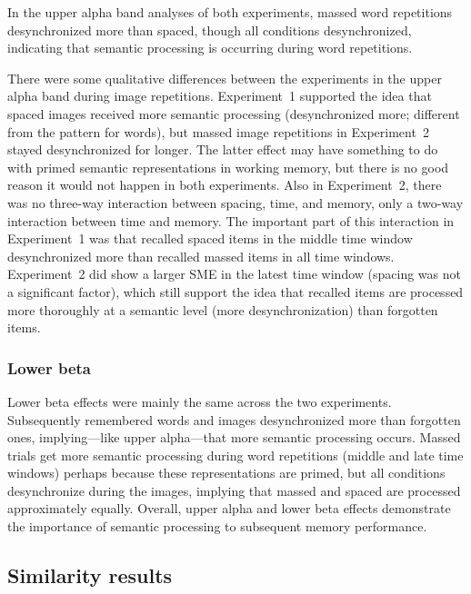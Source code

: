 In the upper alpha band analyses of both experiments, massed word repetitions desynchronized more than spaced, though all conditions desynchronized, indicating that semantic processing is occurring during word repetitions.

There were some qualitative differences between the experiments in the upper alpha band during image repetitions.  Experiment~1 supported the idea that spaced images received more semantic processing (desynchronized more; different from the pattern for words), but massed image repetitions in Experiment~2 stayed desynchronized for longer.  The latter effect may have something to do with primed semantic representations in working memory, but there is no good reason it would not happen in both experiments.  Also in Experiment~2, there was no three-way interaction between spacing, time, and memory, only a two-way interaction between time and memory.  The important part of this interaction in Experiment~1 was that recalled spaced items in the middle time window desynchronized more than recalled massed items in all time windows.  Experiment~2 did show a larger SME in the latest time window (spacing was not a significant factor), which still support the idea that recalled items are processed more thoroughly at a semantic level (more desynchronization) than forgotten items.



\subsubsection{Lower beta}

Lower beta effects were mainly the same across the two experiments.  Subsequently remembered words and images desynchronized more than forgotten ones, implying---like upper alpha---that more semantic processing occurs.
Massed trials get more semantic processing during word repetitions (middle and late time windows) perhaps because these representations are primed, but all conditions desynchronize during the images, implying that massed and spaced are processed approximately equally.  Overall, upper alpha and lower beta effects demonstrate the importance of semantic processing to subsequent memory performance.

\subsection{Similarity results}

